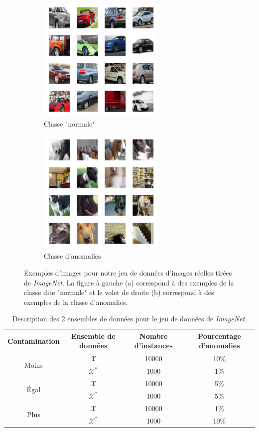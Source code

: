 \begin{figure}[htb]
	\centering
	\begin{subfigure}{6cm}
		\centering\includegraphics[width=6cm]{images/imagenet-inliers}
		\caption{Classe "normale"}
	\end{subfigure}
	\begin{subfigure}{6cm}
		\centering\includegraphics[width=6cm]{images/imagenet-outliers}
		\caption{Classe d'anomalies}
	\end{subfigure}
	\caption{Exemples d'images pour notre jeu de données d'images réelles tirées de \textit{ImageNet}. La figure à gauche (a) correspond à des exemples de la classe dite "normale" et le volet de droite (b) correspond à des exemples de la classe d'anomalies.}
	\label{fig:imagenet}
\end{figure}

\begin{table}[h]
	\centering
	\caption{Description des 2 ensembles de données pour le jeu de données de \textit{ImageNet}.}
	\begin{tabular}{| c | c | c | c |}
		\hline
		\rowcolor{Gray}
		Contamination & Ensemble de données  & Nombre d'instances & Pourcentage d'anomalies  \\
		\hline
		\multirow{2}{*}{Moins} 
		& $\mathcal{X}$ & 10000 & 10\%  \\
		& $\mathcal{X^*}$  & 1000 & 1\%  \\ 
		\midrule
		\multirow{2}{*}{Égal} 
		& $\mathcal{X}$ & 10000 & 5\%  \\
		& $\mathcal{X^*}$  & 1000 & 5\%  \\ 
		\midrule
		\multirow{2}{*}{Plus} 
		& $\mathcal{X}$ & 10000 & 1\%  \\
		& $\mathcal{X^*}$  & 1000 & 10\%  \\ 
		\midrule
	\end{tabular}
	\label{tab:dataset1}
\end{table}

